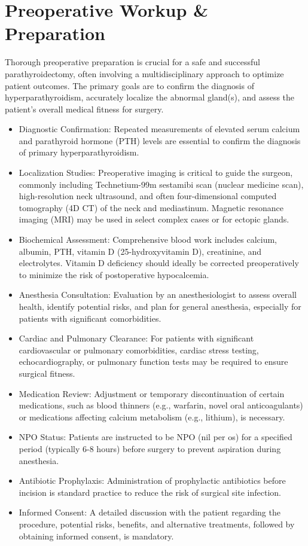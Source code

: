 \section*{Preoperative Workup \& Preparation}
Thorough preoperative preparation is crucial for a safe and successful parathyroidectomy, often involving a multidisciplinary approach to optimize patient outcomes. The primary goals are to confirm the diagnosis of hyperparathyroidism, accurately localize the abnormal gland(s), and assess the patient's overall medical fitness for surgery.

\begin{itemize}
  \item Diagnostic Confirmation: Repeated measurements of elevated serum calcium and parathyroid hormone (PTH) levels are essential to confirm the diagnosis of primary hyperparathyroidism.
  \item Localization Studies: Preoperative imaging is critical to guide the surgeon, commonly including Technetium-99m sestamibi scan (nuclear medicine scan), high-resolution neck ultrasound, and often four-dimensional computed tomography (4D CT) of the neck and mediastinum. Magnetic resonance imaging (MRI) may be used in select complex cases or for ectopic glands.
  \item Biochemical Assessment: Comprehensive blood work includes calcium, albumin, PTH, vitamin D (25-hydroxyvitamin D), creatinine, and electrolytes. Vitamin D deficiency should ideally be corrected preoperatively to minimize the risk of postoperative hypocalcemia.
  \item Anesthesia Consultation: Evaluation by an anesthesiologist to assess overall health, identify potential risks, and plan for general anesthesia, especially for patients with significant comorbidities.
  \item Cardiac and Pulmonary Clearance: For patients with significant cardiovascular or pulmonary comorbidities, cardiac stress testing, echocardiography, or pulmonary function tests may be required to ensure surgical fitness.
  \item Medication Review: Adjustment or temporary discontinuation of certain medications, such as blood thinners (e.g., warfarin, novel oral anticoagulants) or medications affecting calcium metabolism (e.g., lithium), is necessary.
  \item NPO Status: Patients are instructed to be NPO (nil per os) for a specified period (typically 6-8 hours) before surgery to prevent aspiration during anesthesia.
  \item Antibiotic Prophylaxis: Administration of prophylactic antibiotics before incision is standard practice to reduce the risk of surgical site infection.
  \item Informed Consent: A detailed discussion with the patient regarding the procedure, potential risks, benefits, and alternative treatments, followed by obtaining informed consent, is mandatory.
\end{itemize}

